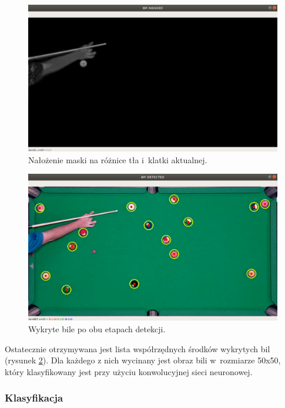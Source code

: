\documentclass[12pt]{article}
\begin{document}
    \begin{figure}[!htb]
        \centering
        \includegraphics[width=15cm]{./images/obrazki/bp/masked_hc.png}
        \caption{Nałożenie maski na różnice tła i~klatki aktualnej.}
        \label{masked_hc}
    \end{figure}

    \begin{figure}[!htb]
        \centering
        \includegraphics[width=15cm]{./images/obrazki/bp/bp_detected_2.png}
        \caption{Wykryte bile po obu etapach detekcji.}
        \label{bp_detected2}
    \end{figure}

    Ostatecznie otrzymywana jest lista współrzędnych środków wykrytych bil (rysunek \ref{bp_detected2}). Dla każdego z nich wycinany jest obraz bili w~rozmiarze 50x50, który klasyfikowany jest przy użyciu konwolucyjnej sieci neuronowej.
 
    \subsubsection{Klasyfikacja}
\end{document}
